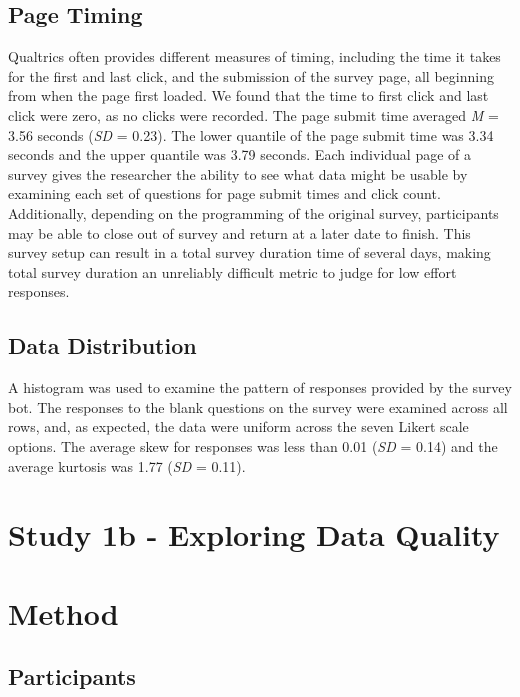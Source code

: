 \documentclass[english,man]{apa6}
\theoremstyle{definition}
\theoremstyle{definition}
\theoremstyle{definition}
\theoremstyle{remark}
\begin{document}
\subsection{Page Timing}\label{page-timing}

Qualtrics often provides different measures of timing, including the
time it takes for the first and last click, and the submission of the
survey page, all beginning from when the page first loaded. We found
that the time to first click and last click were zero, as no clicks were
recorded. The page submit time averaged \emph{M} = 3.56 seconds
(\emph{SD} = 0.23). The lower quantile of the page submit time was 3.34
seconds and the upper quantile was 3.79 seconds. Each individual page of
a survey gives the researcher the ability to see what data might be
usable by examining each set of questions for page submit times and
click count. Additionally, depending on the programming of the original
survey, participants may be able to close out of survey and return at a
later date to finish. This survey setup can result in a total survey
duration time of several days, making total survey duration an
unreliably difficult metric to judge for low effort responses.

\subsection{Data Distribution}\label{data-distribution}

A histogram was used to examine the pattern of responses provided by the
survey bot. The responses to the blank questions on the survey were
examined across all rows, and, as expected, the data were uniform across
the seven Likert scale options. The average skew for responses was less
than 0.01 (\emph{SD} = 0.14) and the average kurtosis was 1.77
(\emph{SD} = 0.11).

\section{Study 1b - Exploring Data
Quality}\label{study-1b---exploring-data-quality}

\section{Method}\label{method-1}

\subsection{Participants}\label{participants}
\end{document}
